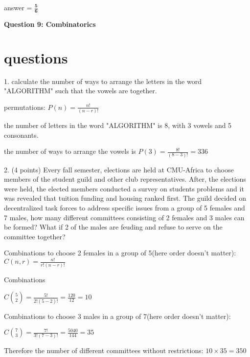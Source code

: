 \documentclass{article}
\begin{document}
answer = \(\mathbf{\frac{5}{6}}\)\newline

\begin{center}
    \large \textbf{Question 9: Combinatorics}
\end{center}

\section{questions}

1. calculate the number of ways to arrange the letters in the word "ALGORITHM" such that the vowels are together.

permutations: \(P(n) = \frac{n!}{(n-r)!}\)

the number of letters in the word "ALGORITHM" is 8, with 3 vowels and 5 consonants.

the number of ways to arrange the vowels is \(P(3) = \frac{8!}{(8-3)!} = 336\) \newline

2. (4 points) Every fall semester, elections are held at CMU-Africa to choose members of the student
guild and other club representatives. After, the elections were held, the elected members conducted
a survey on students problems and it was revealed that tuition funding and housing ranked first.
The guild decided on decentralized task forces to address specific issues from a group of 5 females
and 7 males, how many different committees consisting of 2 females and 3 males can be formed?
What if 2 of the males are feuding and refuse to serve on the committee together?\newline

Combinations to choose 2 females in a group of 5(here order doesn't matter): \(C(n,r) = \frac{n!}{r!(n-r)!}\)\newline

Combinations\newline

\(C\binom{5}{2} = \frac{5!}{2!(5-2)!} = \frac{120}{12} = 10\)\newline

Combinations to choose 3 males in a group of 7(here order doesn't matter):\newline

\(C\binom{7}{3} = \frac{7!}{3!(7-3)!} = \frac{5040}{144} = 35\)\newline

Therefore the number of different committees without restrictions: \(10 \times 35 = 350\)\newline
\end{document}
